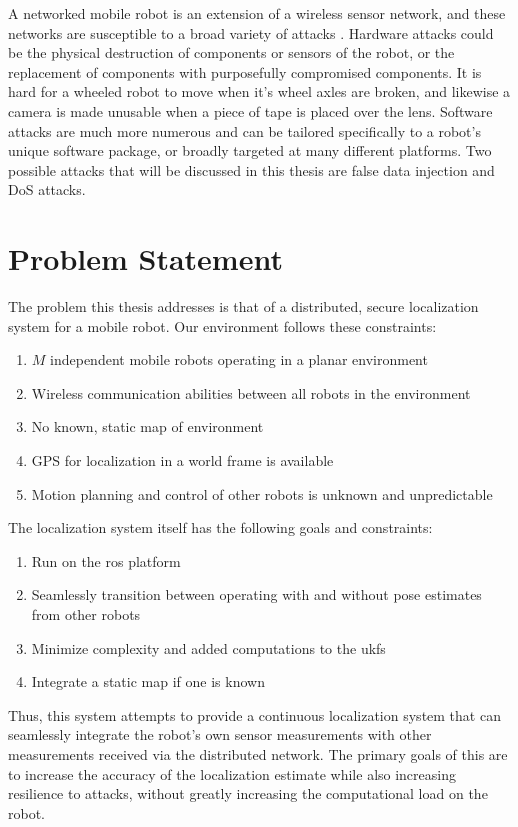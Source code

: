 \documentclass[thesis.tex]{subfile}
\begin{document}
A networked mobile robot is an extension of a wireless sensor network, and these networks are susceptible to a broad variety of attacks \cite{perrig2004security}. Hardware attacks could be the physical destruction of components or sensors of the robot, or the replacement of components with purposefully compromised components. It is hard for a wheeled robot to move when it's wheel axles are broken, and likewise a camera is made unusable when a piece of tape is placed over the lens. Software attacks are much more numerous and can be tailored specifically to a robot's unique software package, or broadly targeted at many different platforms. Two possible attacks that will be discussed in this thesis are false data injection and \gls{DoS} attacks.

\section{Problem Statement} \label{Problem Statement}
The problem this thesis addresses is that of a distributed, secure localization system for a mobile robot. Our environment follows these constraints:
\begin{enumerate}
\item $M$ independent mobile robots operating in a planar environment
\item Wireless communication abilities between all robots in the environment
\item No known, static map of environment
\item GPS for localization in a world frame is available
\item Motion planning and control of other robots is unknown and unpredictable
\end{enumerate}


The localization system itself has the following goals and constraints:
\begin{enumerate}
\item Run on the \gls{ros} platform
\item Seamlessly transition between operating with and without pose estimates from other robots
\item Minimize complexity and added computations to the \glspl{ukf}
\item Integrate a static map if one is known
\end{enumerate}

Thus, this system attempts to provide a continuous localization system that can seamlessly integrate the robot's own sensor measurements with other measurements received via the distributed network. The primary goals of this are to increase the accuracy of the localization estimate while also increasing resilience to attacks, without greatly increasing the computational load on the robot.
\end{document}
